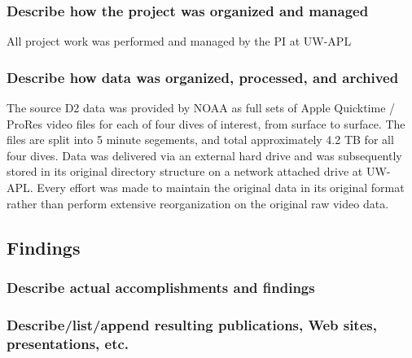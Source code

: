 \documentclass[letterpaper,12pt]{article}
\begin{document}
\subsubsection*{Describe how the project was organized and managed}

All project work was performed and managed by the PI at UW-APL

\subsubsection*{Describe how data was organized, processed, and archived}

The source D2 data was provided by NOAA as full sets of Apple Quicktime / ProRes video files for each of four dives of interest, from surface to surface.   The files are split into 5 minute segements, and total approximately 4.2 TB for all four dives.   Data was delivered via an external hard drive and was subsequently stored in its original directory structure on a network attached drive at UW-APL.  Every effort was made to maintain the original data in its original format rather than perform extensive reorganization on the original raw video data.

\subsection{Findings}
\subsubsection*{Describe actual accomplishments and findings}




\subsubsection*{Describe/list/append resulting publications, Web sites, presentations, etc.}

\end{document}
